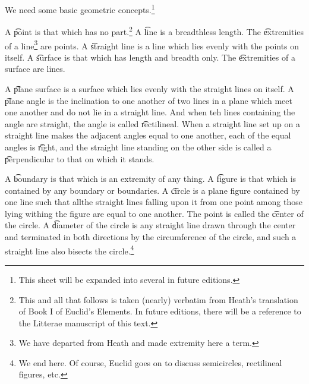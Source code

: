 

We need some basic geometric concepts.\footnote{This sheet will be expanded into several in future editions.}


A \t{point} is that which has no part.\footnote{This and all that follows is taken (nearly) verbatim from Heath's translation of Book I of Euclid's Elements. In future editions, there will be a reference to the Litterae manuscript of this text.}
A \t{line} is a breadthless length.
The \t{extremities of a line}\footnote{We have departed from Heath and made extremity here a term.} are points.
A \t{straight line} is a line which lies evenly with the points on itself.
A \t{surface} is that which has length and breadth only.
The \t{extremities of a surface} are lines.

A \t{plane surface} is a surface which lies evenly with the straight lines on itself.
A \t{plane angle} is the inclination to one another of two lines in a plane which meet one another and do not lie in a straight line.
And when teh lines containing the angle are straight, the angle is called \t{rectilineal}.
  When a straight line set up on a straight line makes the adjacent angles equal to one another, each of the equal angles is \t{right}, and the straight line standing on the other side is called a \t{perpendicular} to that on which it stands.

  A \t{boundary} is that which is an extremity of any thing.
  A \t{figure} is that which is contained by any boundary or boundaries.
  A \t{circle} is a plane figure contained by one line such that allthe straight lines falling upon it from one point among those lying withing the figure are equal to one another.
  The point is called the \t{center} of the circle.
  A \t{diameter} of the circle is any straight line drawn through the center and terminated in both directions by the circumference of the circle, and such a straight line also bisects the circle.\footnote{We end here. Of course, Euclid goes on to discuss semicircles, rectilineal figures, etc.}
